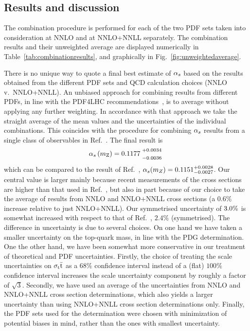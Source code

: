 \subsection{Results and discussion}


The combination procedure is performed for each of the two PDF sets
taken into consideration at NNLO and at NNLO+NNLL separately. The
combination results and their unweighted average are displayed
numerically in Table~\ref{tab:combinationresults}, and graphically in
Fig.~\ref{fig:unweightedaverage}.

There is no unique way to quote a final best estimate of $\alpha_s$ based
on the results obtained from the different PDF sets and QCD
calculation choices (NNLO v.\ NNLO+NNLL).
%
An unbiased approach for combining results from different PDFs, in
line with the PDF4LHC recommendations~\cite{PDF4LHC}, is to average
without applying any further weighting.
%
In accordance with that approach we take the straight average of the mean
values and the uncertainties of the individual combinations.
%
This coincides with the procedure for combining $\alpha_s$ results from a
single class of observables in Ref.~\cite{PDG}.
%
The final result is
\begin{equation}
\asmz =
    \alphasResultCenter
    \; {}^{\highersub{$+\alphasResultRightError${}}}_{\lowersub{$-\alphasResultLeftError${} }}
\end{equation}
%
which can be compared to the result of Ref.~\cite{CMS-ttbar-alphas},
$\alpha_s(m_Z) = 0.1151^{+0.0028}_{-0.0027}$.
%
Our central value is larger mainly because recent measurements of the
cross sections are higher than that used in
Ref.~\cite{CMS-ttbar-alphas}, but also in part because of our choice
to take the average of results from NNLO and NNLO+NNLL cross sections
(a $0.6\%$ increase relative to just NNLO+NNLL).
%
Our symmetrised uncertainty of $3.0\%$ is
somewhat increased with respect to that of
Ref.~\cite{CMS-ttbar-alphas}, $2.4\%$ (symmetrised).
%
The difference in uncertainty is due to several choices.
%
On one hand we have taken a smaller uncertainty on the top-quark mass,
in line with the PDG determination.
%
One the other hand, we have been somewhat more conservative in our
treatment of theoretical and PDF uncertainties.
%
Firstly, the choice of treating the scale uncertainties on $\sigma_\mathrm{t}\bar{\mathrm{t}}$ as a
$68\%$ confidence interval instead of a (flat) $100\%$ confidence
interval increases the scale uncertainty component by roughly a factor
of $\sqrt{3}$.
%
Secondly, we have used an average of the uncertainties from NNLO and
NNLO+NNLL cross section determinations, which also yields a larger
uncertainty than using NNLO+NNLL cross section determinations only.
%
Finally, the PDF sets used for the determination were chosen with
minimization of potential biases in mind, rather than the ones with
smallest uncertainty.
%


